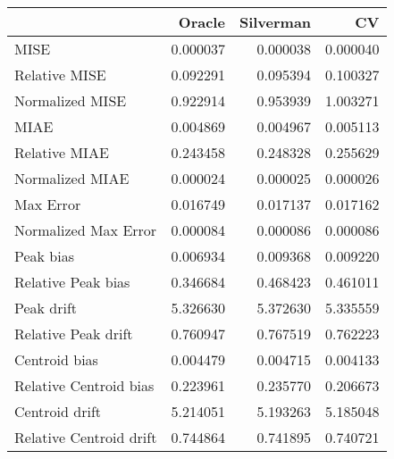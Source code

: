 \begin{tabular}{lrrr}
  \hline
 & Oracle & Silverman & CV \\ 
  \hline
MISE & 0.000037 & 0.000038 & 0.000040 \\ 
  Relative MISE & 0.092291 & 0.095394 & 0.100327 \\ 
  Normalized MISE & 0.922914 & 0.953939 & 1.003271 \\ 
  MIAE & 0.004869 & 0.004967 & 0.005113 \\ 
  Relative MIAE & 0.243458 & 0.248328 & 0.255629 \\ 
  Normalized MIAE & 0.000024 & 0.000025 & 0.000026 \\ 
  Max Error & 0.016749 & 0.017137 & 0.017162 \\ 
  Normalized Max Error & 0.000084 & 0.000086 & 0.000086 \\ 
  Peak bias & 0.006934 & 0.009368 & 0.009220 \\ 
  Relative Peak bias & 0.346684 & 0.468423 & 0.461011 \\ 
  Peak drift & 5.326630 & 5.372630 & 5.335559 \\ 
  Relative Peak drift & 0.760947 & 0.767519 & 0.762223 \\ 
  Centroid bias & 0.004479 & 0.004715 & 0.004133 \\ 
  Relative Centroid bias & 0.223961 & 0.235770 & 0.206673 \\ 
  Centroid drift & 5.214051 & 5.193263 & 5.185048 \\ 
  Relative Centroid drift & 0.744864 & 0.741895 & 0.740721 \\ 
   \hline
\end{tabular}
